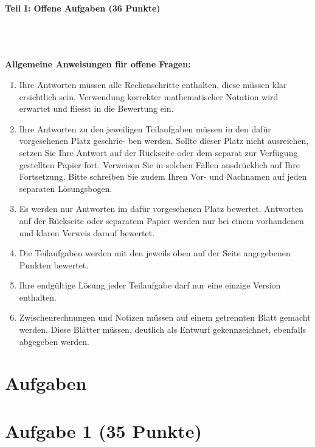 

\begin{Large}
\textbf{Teil I: Offene Aufgaben (36 Punkte)}
\end{Large}
\\
\\
\\
\textbf{Allgemeine Anweisungen für offene Fragen:}
\\
\renewcommand{\labelenumi}{(\roman{enumi})}
\begin{enumerate}
\item
Ihre Antworten müssen alle Rechenschritte enthalten,
diese müssen klar ersichtlich sein.
Verwendung korrekter mathematischer Notation wird erwartet
und fliesst in die Bewertung ein.

\item
Ihre Antworten zu den jeweiligen Teilaufgaben müssen in den dafür vorgesehenen Platz geschrie-
ben werden. Sollte dieser Platz nicht ausreichen, setzen Sie Ihre Antwort auf der Rückseite oder
dem separat zur Verfügung gestellten Papier fort. Verweisen Sie in solchen Fällen ausdrücklich
auf Ihre Fortsetzung. Bitte schreiben Sie zudem Ihren Vor- und Nachnamen auf jeden separaten
Lösungsbogen.

\item
Es werden nur Antworten im dafür vorgesehenen Platz bewertet. Antworten auf der Rückseite
oder separatem Papier werden nur bei einem vorhandenen und klaren Verweis darauf bewertet.

\item
Die Teilaufgaben werden mit den jeweils oben auf der Seite angegebenen Punkten bewertet.

\item
Ihre endgültige Lösung jeder Teilaufgabe darf nur eine einzige Version enthalten.

\item
Zwischenrechnungen und Notizen müssen auf einem getrennten Blatt gemacht werden. Diese
Blätter müssen, deutlich als Entwurf gekennzeichnet, ebenfalls abgegeben werden.
\end{enumerate}

\newpage
\section*{\hfil Aufgaben \hfil}
\vspace{1cm}
\section*{Aufgabe 1 (35 Punkte)}
\vspace{0.4cm}
